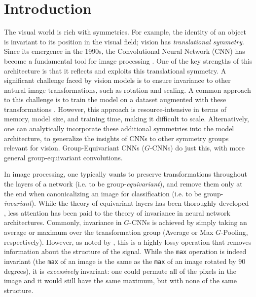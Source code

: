 \documentclass{article}
\theoremstyle{plain}
\theoremstyle{definition}
\theoremstyle{remark}
\begin{document}
\section{Introduction}\label{sec:introduction}
The visual world is rich with symmetries.
For example, the identity of an object is invariant to its position in the visual field; vision has \textit{translational symmetry}. Since its emergence in the 1990s, the Convolutional Neural Network (CNN) has become a fundamental tool for image processing \cite{lecun95convolutional,LeNet5}. One of the key strengths of this architecture is that it reflects and exploits this translational symmetry. A significant challenge faced by vision models is to ensure invariance to other natural image transformations, such as rotation and scaling. A common approach to this challenge is to train the model on a dataset augmented with these transformations \cite{shorten2019survey}. However, this approach is resource-intensive in terms of memory, model size, and training time, making it difficult to scale. Alternatively, one can analytically incorporate these additional symmetries into the model architecture, to generalize the insights of CNNs to other symmetry groups relevant for vision. Group-Equivariant CNNs ($G$-CNNs) \cite{cohenc16} do just this, with more general group-equivariant convolutions.

In image processing, one typically wants to preserve transformations throughout the layers of a network (i.e. to be group-\textit{equivariant}), and remove them only at the end when canonicalizing an image for classification (i.e. to be group-\textit{invariant}). While the theory of equivariant layers has been thoroughly developed \cite{cohen2021equivariant, weiler2023EquivariantAndCoordinateIndependentCNNs}, less attention has been paid to the theory of invariance
in neural network architectures. Commonly, invariance in $G$-CNNs is achieved by simply taking an average or maximum over the transformation group (Average or Max $G$-Pooling, respectively). However, as noted by \citet{sanborn2023general}, this is a highly lossy operation that removes information about the structure of the signal. While the \texttt{max} operation is indeed invariant (the \texttt{max} of an image is the same as the \texttt{max} of an image rotated by $90$ degrees), it is \textit{excessively} invariant: one could permute all of the pixels in the image and it would still have the same maximum, but with none of the same structure.
\end{document}
